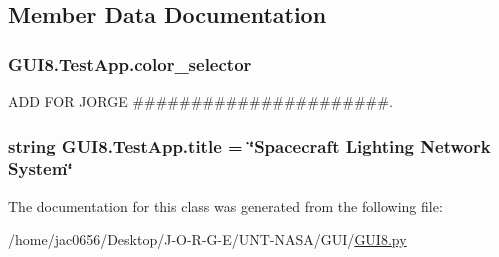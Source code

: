 \subsection{Member Data Documentation}
\subsubsection[{\texorpdfstring{color\+\_\+selector}{color_selector}}]{\setlength{\rightskip}{0pt plus 5cm}G\+U\+I8.\+Test\+App.\+color\+\_\+selector}\hypertarget{classGUI8_1_1TestApp_aead69a0b4419bbaa10eed9063007b648}{}\label{classGUI8_1_1TestApp_aead69a0b4419bbaa10eed9063007b648}


A\+DD F\+OR J\+O\+R\+GE \#\#\#\#\#\#\#\#\#\#\#\#\#\#\#\#\#\#\#\#\#\#. 

\subsubsection[{\texorpdfstring{title}{title}}]{\setlength{\rightskip}{0pt plus 5cm}string G\+U\+I8.\+Test\+App.\+title = \char`\"{}Spacecraft Lighting Network System\char`\"{}\hspace{0.3cm}{\ttfamily [static]}}\hypertarget{classGUI8_1_1TestApp_a4763321ddfa92947fcf3c8501848ab75}{}\label{classGUI8_1_1TestApp_a4763321ddfa92947fcf3c8501848ab75}


The documentation for this class was generated from the following file\+:\begin{DoxyCompactItemize}
\item 
/home/jac0656/\+Desktop/\+J-\/\+O-\/\+R-\/\+G-\/\+E/\+U\+N\+T-\/\+N\+A\+S\+A/\+G\+U\+I/\hyperlink{GUI_2GUI8_8py}{G\+U\+I8.\+py}\end{DoxyCompactItemize}
